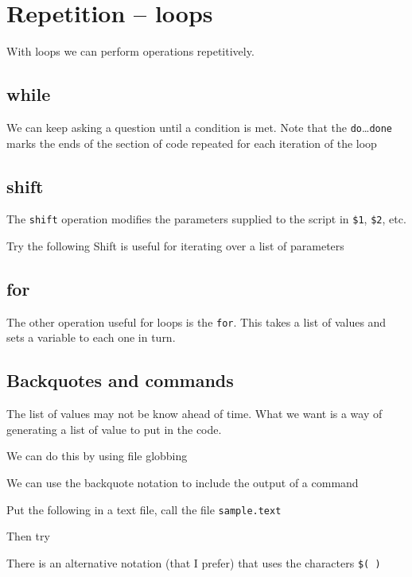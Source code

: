 \documentclass[12pt,a4paper]{article}
\begin{document}
\section{Repetition -- loops}
With loops we can perform operations repetitively.

\subsection{while}
We can keep asking a question until a condition is met.
Note that the \texttt{do}\ldots\texttt{done} marks the ends of the
section of code repeated for each iteration of the loop

\subsection{shift}
The \texttt{shift} operation modifies the parameters supplied to the
script in \texttt{\$1}, \texttt{\$2}, etc.

Try the following
Shift is useful for iterating over a list of parameters

\subsection{for}
The other operation useful for loops is the \texttt{for}.
This takes a list of values and sets a variable to each one in turn.

\subsection{Backquotes and commands}
The list of values may not be know ahead of time.  What we want is a
way of generating a list of value to put in the code.

We can do this by using file globbing

We can use the backquote notation to include the output of a command

Put the following in a text file, call the file \texttt{sample.text}



Then try

There is an alternative notation (that I prefer) that uses the
characters \texttt{\$( )}
\end{document}
